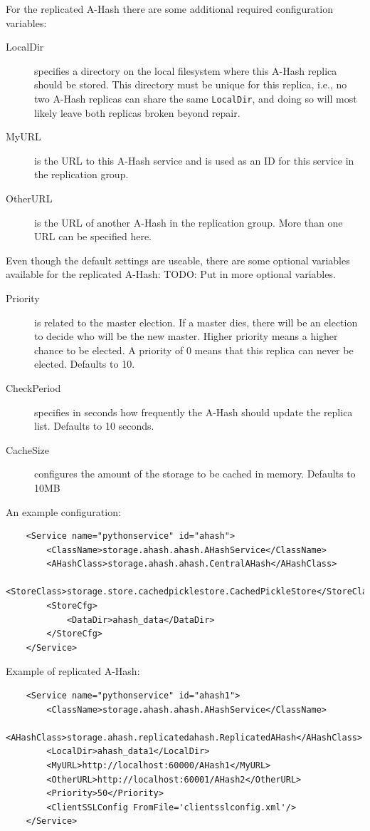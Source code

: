 \documentclass{book}
\begin{document}
For the replicated A-Hash there are some additional required configuration variables:

\begin{description}
    \item[LocalDir] specifies a directory on the local filesystem where this A-Hash replica should be stored. This directory must be unique for this replica, i.e., no two A-Hash replicas can share the same \verb!LocalDir!, and doing so will most likely leave both replicas broken beyond repair.
    \item[MyURL] is the URL to this A-Hash service and is used as an ID for this service in the replication group.
    \item[OtherURL] is the URL of another A-Hash in the replication group. More than one URL can be specified here.
\end{description}

Even though the default settings are useable, there are some optional variables available for the replicated A-Hash:
TODO: Put in more optional variables.
\begin{description}
    \item[Priority] is related to the master election. If a master dies, there will be an election to decide who will be the new master. Higher priority means a higher chance to be elected. A priority of 0 means that this replica can never be elected. Defaults to 10.
    \item[CheckPeriod] specifies in seconds how frequently the A-Hash should update the replica list. Defaults to 10 seconds.
    \item[CacheSize] configures the amount of the storage to be cached in memory. Defaults to 10MB
\end{description}


An example configuration:

\begin{verbatim}
    <Service name="pythonservice" id="ahash">
        <ClassName>storage.ahash.ahash.AHashService</ClassName>
        <AHashClass>storage.ahash.ahash.CentralAHash</AHashClass>
        <StoreClass>storage.store.cachedpicklestore.CachedPickleStore</StoreClass>
        <StoreCfg>
            <DataDir>ahash_data</DataDir>
        </StoreCfg>
    </Service>
\end{verbatim}

Example of replicated A-Hash:
\begin{verbatim}
    <Service name="pythonservice" id="ahash1">
        <ClassName>storage.ahash.ahash.AHashService</ClassName>
        <AHashClass>storage.ahash.replicatedahash.ReplicatedAHash</AHashClass>
        <LocalDir>ahash_data1</LocalDir>
        <MyURL>http://localhost:60000/AHash1</MyURL>
        <OtherURL>http://localhost:60001/AHash2</OtherURL>
        <Priority>50</Priority>
        <ClientSSLConfig FromFile='clientsslconfig.xml'/>
    </Service>
\end{verbatim}
\end{document}
